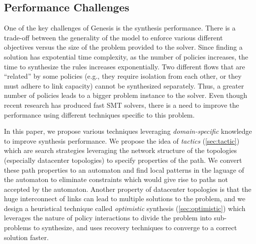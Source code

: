\subsection{Performance Challenges} \label{sec:performance}

One of the key challenges of Genesis is the synthesis
performance. There is a trade-off between the generality of the model
to enforce various different objectives versus the size of the problem
provided to the solver.  Since finding a solution has expotential time
complexity, as the number of policies increases, the time to
synthesize the rules increases exponentially. Two different flows that
are ``related'' by some policies (e.g., they require isolation from
each other, or they must adhere to link capacity) cannot be
synthesized separately.  Thus, a greater number of policies leads to a
bigger problem instance to the solver. Even though recent research has
produced fast SMT solvers, there is a need to improve the performance
using different techniques specific to this problem.

In this paper, we propose various techniques leveraging
\emph{domain-specific} knowledge to improve synthesis performance. We
propose the idea of \emph{tactics} (\cref{sec:tactic}) which are
search strategies leveraging the network structure of the topologies
(especially datacenter topologies) to specify properties of the
path. We convert these path properties to an automaton and find local
patterns in the laguage of the automaton to eliminate constraints
which would give rise to paths not accepted by the automaton. Another
property of datacenter topologies is that the huge interconnect of
links can lead to multiple solutions to the problem, and we design a
heuristical technique called \emph{optimistic} synthesis
(\cref{sec:optimistic}) which leverages the nature of policy
interactions to divide the problem into sub-problems to synthesize,
and uses recovery techniques to converge to a correct solution faster.

